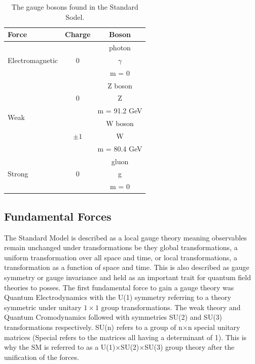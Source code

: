     \begin {table}[h]
      \begin{center}
      \begin{tabular}{|l|c|c|}
         \hline
         Force & Charge & Boson \\
         \hline
         \multirow{3}{*}{Electromagnetic} & \multirow{3}{*}{\Large 0} & photon \\
         & & {\Huge $\gamma$} \\
         & & m = 0 \\
         \hline
         \multirow{6}{*}{Weak} & \multirow{3}{*}{\Large 0} & Z boson \\
         & & {\Huge Z} \\
         & & m = 91.2 GeV \\
         \cline{2-3}
         & \multirow{3}{*}{\Large $\pm1$} & W boson \\
         & & {\Huge W} \\
         & & m = 80.4 GeV \\
         \hline
         \multirow{3}{*}{Strong} & \multirow{3}{*}{\Large 0} & gluon \\
         & & {\Huge g} \\
         & & m = 0 \\
         \hline
      \end{tabular}
      \caption{The gauge bosons found in the Standard Sodel.}
      \label{tab:bosons}
      \end{center}
    \end {table}



    \subsection{Fundamental Forces}
    The Standard Model is described as a local gauge theory meaning observables remain unchanged under transformations be they global transformations, a uniform transformation over all space and time, or local transformations, a transformation as a function of space and time. This is also described as gauge symmetry or gauge invariance and held as an important trait for quantum field theories to posses. The first fundamental force to gain a gauge theory was Quantum Electrodynamics with the U(1) symmetry referring to a theory symmetric under unitary $1\times1$ group transformations. The weak theory and Quantum Cromodynamics followed with symmetries SU(2) and SU(3) transformations respectively. SU(n) refers to a group of n$\times$n special unitary matrices (Special refers to the matrices all having a determinant of 1). This is why the SM is referred to as a U(1)$\times$SU(2)$\times$SU(3) group theory after the unification of the forces.


